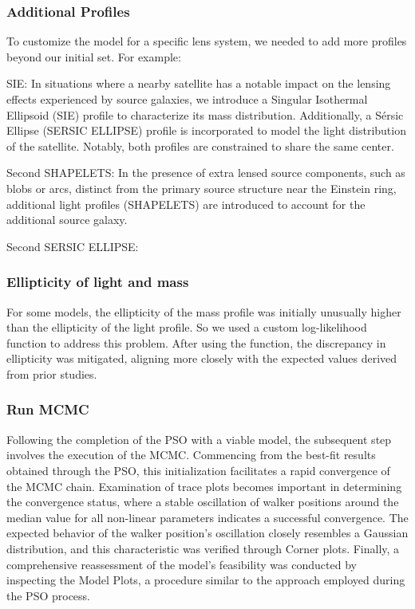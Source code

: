 \documentclass{aa}
\begin{document}
\subsubsection{Additional Profiles}
To customize the model for a specific lens system, we needed to add more profiles beyond our initial set. For example: 

SIE: In situations where a nearby satellite has a notable impact on the lensing effects experienced by source galaxies, we introduce a Singular Isothermal Ellipsoid (SIE) profile to characterize its mass distribution. Additionally, a S\'ersic Ellipse (SERSIC ELLIPSE) profile is incorporated to model the light distribution of the satellite. Notably, both profiles are constrained to share the same center.

Second SHAPELETS: In the presence of extra lensed source components, such as blobs or arcs, distinct from the primary source structure near the Einstein ring, additional light profiles (SHAPELETS) are introduced to account for the additional source galaxy. 

Second SERSIC ELLIPSE:

\subsubsection{Ellipticity of light and mass}
For some models, the ellipticity of the mass profile was initially unusually higher than the ellipticity of the light profile. So we used a custom log-likelihood function to address this problem. After using the function, the discrepancy in ellipticity was mitigated, aligning more closely with the expected values derived from prior studies.

\subsubsection{Run MCMC}
Following the completion of the PSO with a viable model, the subsequent step involves the execution of the MCMC. Commencing from the best-fit results obtained through the PSO, this initialization facilitates a rapid convergence of the MCMC chain. Examination of trace plots becomes important in determining the convergence status, where a stable oscillation of walker positions around the median value for all non-linear parameters indicates a successful convergence. The expected behavior of the walker position's oscillation closely resembles a Gaussian distribution, and this characteristic was verified through Corner plots. Finally, a comprehensive reassessment of the model's feasibility was conducted by inspecting the Model Plots, a procedure similar to the approach employed during the PSO process.
\end{document}
